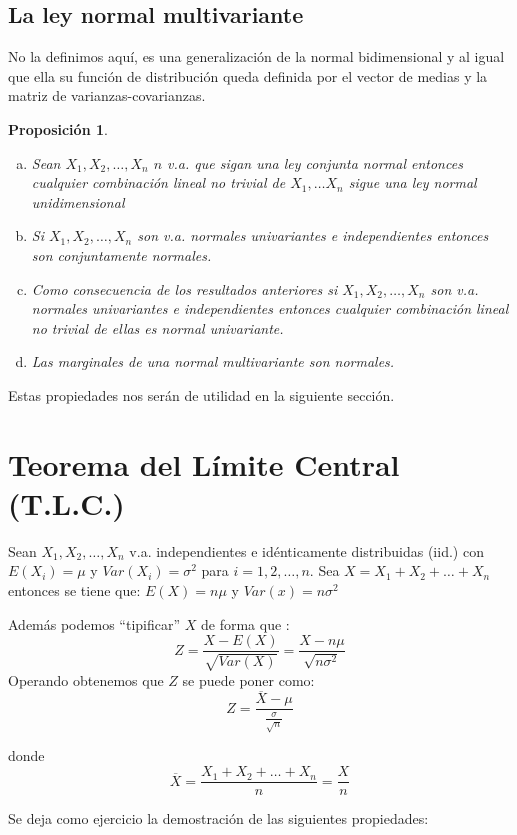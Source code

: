 \documentclass[12pt]{report}
\newtheorem{proposition}[definition]{Proposici\'on}
\begin{document}
\subsection{La ley normal multivariante}

No la definimos aquí, es una generalización de la normal bidimensional y al igual que ella
su función de distribución queda definida por el vector de medias y la matriz de varianzas-covarianzas.

\begin{proposition}
\begin{enumerate}[a)]
\item Sean $X_1,X_2,\ldots,X_n$ $n$ v.a. que sigan una ley conjunta normal entonces cualquier
combinación lineal no trivial de $X_1,\ldots X_n$ sigue una ley normal unidimensional
\item Si $X_1,X_2,\ldots,X_n$ son v.a. normales univariantes e independientes entonces son
conjuntamente normales.
\item Como consecuencia de los resultados anteriores si $X_1,X_2,\ldots,X_n$
son v.a. normales univariantes e independientes entonces cualquier combinación lineal no
trivial de ellas es normal univariante.
\item Las marginales de una normal multivariante son normales.
\end{enumerate}
\end{proposition}

Estas propiedades nos serán de utilidad en la siguiente sección.

\section{Teorema  del Límite Central (T.L.C.)}

    Sean $X_{1},X_{2},\ldots,X_{n}$ v.a. independientes e idénticamente distribuidas (iid.)
    con $E(X_i)=\mu$ y $Var(X_i)=\sigma^2$ para $i=1,2,\ldots,n$.
    Sea $X=X_{1}+X_{2}+\ldots+X_{n}$
    entonces se tiene que:
    $E(X)=n\mu$ y $Var(x)= n\sigma^2$

    Además podemos ``tipificar'' $X$ de forma que :
    $$Z=\frac{X-E(X)}{\sqrt{Var(X)}}=\frac{X-n\mu}{\sqrt{n\sigma^2}}$$
    Operando obtenemos que $Z$ se puede poner como:
    $$Z=\frac{\overline{X}-\mu}{\frac{\sigma}{\sqrt{n}}}$$

    donde
    $$\overline{X}=\frac{X_{1}+X_{2}+\ldots+X_{n}}{n}=\frac{X}{n}$$


Se deja como ejercicio la demostración de las siguientes propiedades:
\end{document}
